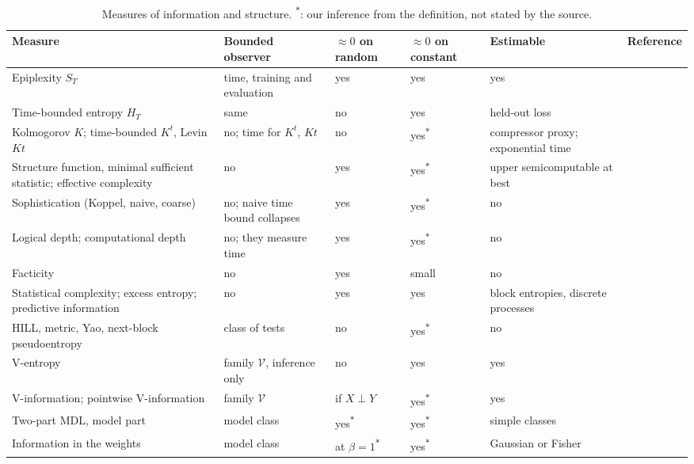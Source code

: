 \documentclass[11pt]{article}
\newcommand{\od}{\textsuperscript{$\ast$}}
\theoremstyle{tight}
\begin{document}
\begin{table}[!htb]
\centering\footnotesize
\caption{Measures of information and structure. \od: our inference from the definition, not stated by
the source.}\label{tab:theory}
\begin{tabularx}{\textwidth}{@{}P{4.4cm}P{2.6cm}P{1.3cm}P{1.3cm}P{2.2cm}L@{}}
\toprule
Measure & Bounded observer & $\approx0$ on random & $\approx0$ on constant & Estimable & Reference \\
\midrule
Epiplexity $S_T$ & time, training and evaluation & yes & yes & yes & \citet{finzi2026epiplexity} \\
Time-bounded entropy $H_T$ & same & no & yes & held-out loss & \citet{finzi2026epiplexity} \\
Kolmogorov $K$; time-bounded $K^t$, Levin $Kt$ & no; time for $K^t$, $Kt$ & no & yes\od & compressor proxy; exponential time & \citet{livitanyi2019,levin1973,allender2011} \\
Structure function, minimal sufficient statistic; effective complexity & no & yes & yes\od & upper semicomputable at best & \citet{vereshchagin2004,gacs2001,gellmann1996,ay2010} \\
Sophistication (Koppel, naive, coarse) & no; naive time bound collapses & yes & yes\od & no & \citet{koppel1987,antunes2009,mota2013} \\
Logical depth; computational depth & no; they measure time & yes & yes\od & no & \citet{bennett1988,antunes2006} \\
Facticity & no & yes & small & no & \citet{adriaans2009,adriaans2012} \\
Statistical complexity; excess entropy; predictive information & no & yes & yes & block entropies, discrete processes & \citet{shalizi2001,crutchfield2003,bialek2001} \\
HILL, metric, Yao, next-block pseudoentropy & class of tests & no & yes\od & no & \citet{hastad1999,barak2003,haitner2013,vadhan2012} \\
V-entropy & family $\mathcal V$, inference only & no & yes & yes & \citet{xu2020} \\
V-information; pointwise V-information & family $\mathcal V$ & if $X\perp Y$ & yes\od & yes & \citet{xu2020,ethayarajh2022} \\
Two-part MDL, model part & model class & yes\od & yes\od & simple classes & \citet{rissanen1978,grunwald2007} \\
Information in the weights & model class & at $\beta=1$\od & yes\od & Gaussian or Fisher & \citet{achille2019,achille2021} \\
\bottomrule
\end{tabularx}
\end{table}
\end{document}
